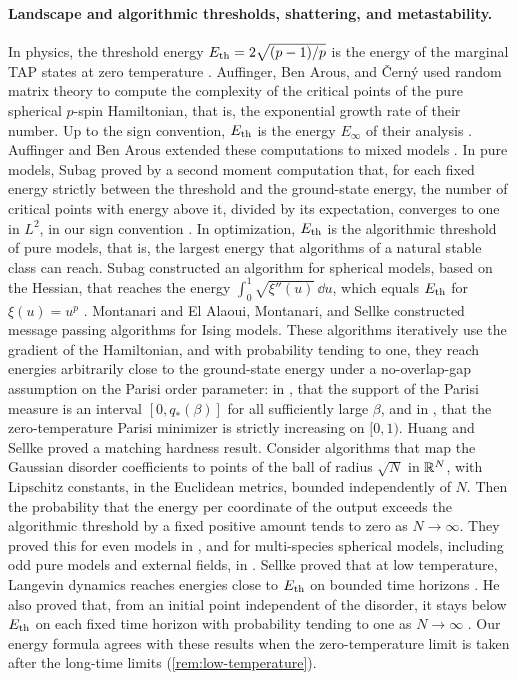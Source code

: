 \paragraph{Landscape and algorithmic thresholds, shattering, and metastability.}
In physics, the threshold energy $E_{\mathrm{th}}=2\sqrt{(p-1)/p}$ is the energy of the marginal TAP states at zero temperature \cite[Equation~(9)]{cs1995}. Auffinger, Ben Arous, and \v{C}ern\'y used random matrix theory to compute the complexity of the critical points of the pure spherical $p$-spin Hamiltonian, that is, the exponential growth rate of their number. Up to the sign convention, $E_{\mathrm{th}}$ is the energy $E_\infty$ of their analysis \cite[Equation~(2.13)]{abc2013}. Auffinger and Ben Arous extended these computations to mixed models \cite{ab2013}. In pure models, Subag proved by a second moment computation that, for each fixed energy strictly between the threshold and the ground-state energy, the number of critical points with energy above it, divided by its expectation, converges to one in $L^2$, in our sign convention \cite[Theorem~1 and Corollary~2]{subag2017}. In optimization, $E_{\mathrm{th}}$ is the algorithmic threshold of pure models, that is, the largest energy that algorithms of a natural stable class can reach. Subag constructed an algorithm for spherical models, based on the Hessian, that reaches the energy $\int_0^1\sqrt{\xi''(u)}\,\dd u$, which equals $E_{\mathrm{th}}$ for $\xi(u)=u^p$ \cite{subag2021}. Montanari \cite{montanari2019} and El Alaoui, Montanari, and Sellke \cite{eams2021} constructed message passing algorithms for Ising models. These algorithms iteratively use the gradient of the Hamiltonian, and with probability tending to one, they reach energies arbitrarily close to the ground-state energy under a no-overlap-gap assumption on the Parisi order parameter: in \cite[Assumption~1]{montanari2019}, that the support of the Parisi measure is an interval $[0,q_*(\beta)]$ for all sufficiently large $\beta$, and in \cite[arXiv version~1, Assumption~2]{eams2021}, that the zero-temperature Parisi minimizer is strictly increasing on $[0,1)$. Huang and Sellke proved a matching hardness result. Consider algorithms that map the Gaussian disorder coefficients to points of the ball of radius $\sqrt N$ in $\mathbb R^N$, with Lipschitz constants, in the Euclidean metrics, bounded independently of $N$. Then the probability that the energy per coordinate of the output exceeds the algorithmic threshold by a fixed positive amount tends to zero as $N\to\infty$. They proved this for even models in \cite{hs2021}, and for multi-species spherical models, including odd pure models and external fields, in \cite[Theorem~1 and Corollary~1.8]{hs2023}. Sellke proved that at low temperature, Langevin dynamics reaches energies close to $E_{\mathrm{th}}$ on bounded time horizons \cite[Theorem~1.1]{sellke2024}. He also proved that, from an initial point independent of the disorder, it stays below $E_{\mathrm{th}}$ on each fixed time horizon with probability tending to one as $N\to\infty$ \cite[Theorem~1.7]{sellke2024}. Our energy formula agrees with these results when the zero-temperature limit is taken after the long-time limits (\cref{rem:low-temperature}).

